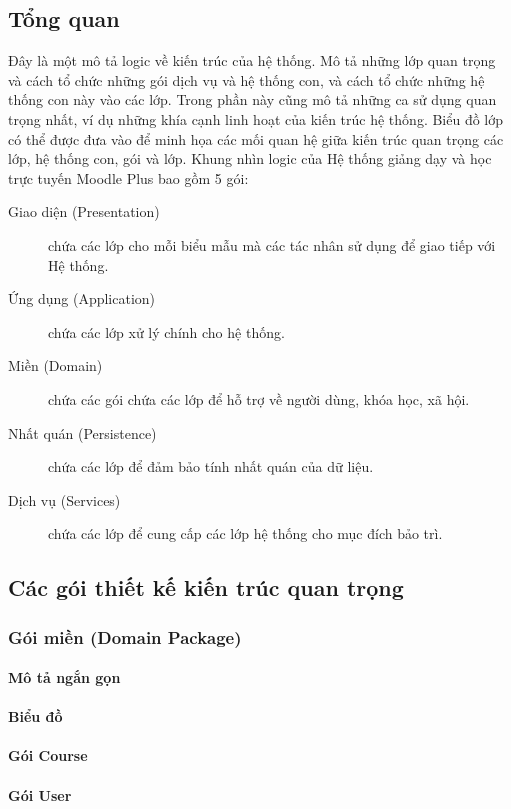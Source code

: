 \documentclass[./../main_file.tex]{subfiles}
\begin{document}
	\subsection{Tổng quan}
	Đây là một mô tả logic về kiến trúc của hệ thống. Mô tả những lớp quan trọng và cách tổ chức những gói dịch vụ và hệ thống con, và cách tổ chức những hệ thống con này vào các lớp. Trong phần này cũng mô tả những ca sử dụng quan trọng nhất, ví dụ những khía cạnh linh hoạt của kiến trúc hệ thống. Biểu đồ lớp có thể được đưa vào để minh họa các mối quan hệ giữa kiến trúc quan trọng các lớp, hệ thống con, gói và lớp.
	Khung nhìn logic của Hệ thống giảng dạy và học trực tuyến Moodle Plus bao gồm 5 gói:
	\begin{description}
		\item[Giao diện (Presentation)] chứa các lớp cho mỗi biểu mẫu mà các tác nhân sử dụng để giao tiếp với Hệ thống.
		\item[Ứng dụng (Application)] chứa các lớp xử lý chính cho hệ thống.
		\item[Miền (Domain)] chứa các gói chứa các lớp để hỗ trợ về người dùng, khóa học, xã hội.
		\item[Nhất quán (Persistence)] chứa các lớp để đảm bảo tính nhất quán của dữ liệu.
		\item[Dịch vụ (Services)] chứa các lớp để cung cấp các lớp hệ thống cho mục đích bảo trì.
	\end{description}
	\subsection{Các gói thiết kế kiến trúc quan trọng}
	\subsubsection{Gói miền (Domain Package)}
	\paragraph{Mô tả ngắn gọn}
	\paragraph{Biểu đồ}
	\paragraph{Gói Course}
	\paragraph{Gói User}
\end{document}
